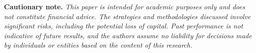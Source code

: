 %
%




\textbf{Cautionary note.} \textit{This paper is intended for academic %
purposes only and does not constitute financial advice. The strategies and methodologies discussed involve significant risks, including the potential loss of capital. Past performance is not indicative of future results, and the authors assume no liability for decisions made by individuals or entities based on the content of this research. 
}